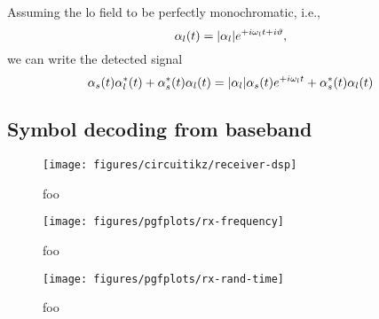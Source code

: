 
Assuming the \gls{lo} field to be perfectly monochromatic, i.e.,
\begin{equation}
	\alpha_l(t)
	=
	\lvert\alpha_l\rvert
	e^{+i\omega_lt+i\vartheta}
	,
\end{equation}
we can write the detected signal
\begin{equation}
	\alpha_s(t)
	\alpha_l^*(t)
	+
	\alpha_s^*(t)
	\alpha_l(t)
	=
	\lvert\alpha_l\rvert
	\alpha_s(t)
	e^{+i\omega_l t}
	+
	\alpha_s^*(t)
	\alpha_l(t)	
\end{equation}

\FloatBarrier
\subsection{Symbol decoding from baseband}

\begin{figure}[htb]
	\centering
	\texttt{[image: figures/circuitikz/receiver-dsp]}
	\caption{foo}
\end{figure}

\begin{figure}[htb]
	\centering
	\texttt{[image: figures/pgfplots/rx-frequency]}
	\caption{foo}
\end{figure}

\begin{figure}[htb]
	\centering
	\texttt{[image: figures/pgfplots/rx-rand-time]}
	\caption{foo}
\end{figure}
